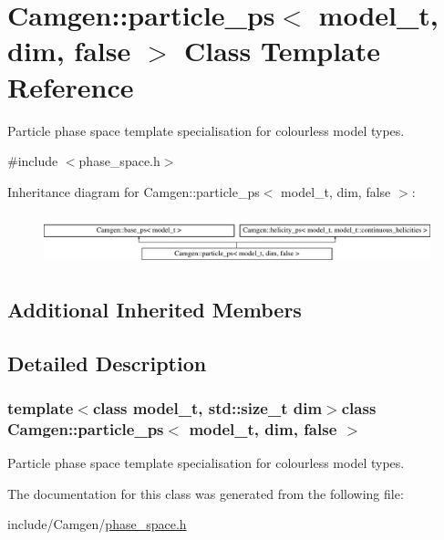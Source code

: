 \hypertarget{a00409}{}\section{Camgen\+:\+:particle\+\_\+ps$<$ model\+\_\+t, dim, false $>$ Class Template Reference}
\label{a00409}


Particle phase space template specialisation for colourless model types.  




{\ttfamily \#include $<$phase\+\_\+space.\+h$>$}

Inheritance diagram for Camgen\+:\+:particle\+\_\+ps$<$ model\+\_\+t, dim, false $>$\+:\begin{figure}[H]
\begin{center}
\leavevmode
\includegraphics[height=1.497326cm]{a00409}
\end{center}
\end{figure}
\subsection*{Additional Inherited Members}


\subsection{Detailed Description}
\subsubsection*{template$<$class model\+\_\+t, std\+::size\+\_\+t dim$>$class Camgen\+::particle\+\_\+ps$<$ model\+\_\+t, dim, false $>$}

Particle phase space template specialisation for colourless model types. 

The documentation for this class was generated from the following file\+:\begin{DoxyCompactItemize}
\item 
include/\+Camgen/\hyperlink{a00718}{phase\+\_\+space.\+h}\end{DoxyCompactItemize}
